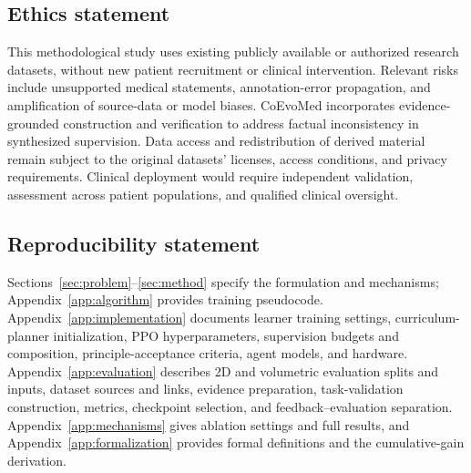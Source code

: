 \documentclass{article}
\begin{document}
\subsection*{Ethics statement}
This methodological study uses existing publicly available or authorized research datasets, without new patient recruitment or clinical intervention. Relevant risks include unsupported medical statements, annotation-error propagation, and amplification of source-data or model biases. CoEvoMed incorporates evidence-grounded construction and verification to address factual inconsistency in synthesized supervision. Data access and redistribution of derived material remain subject to the original datasets' licenses, access conditions, and privacy requirements. Clinical deployment would require independent validation, assessment across patient populations, and qualified clinical oversight.

\subsection*{Reproducibility statement}
Sections~\ref{sec:problem}--\ref{sec:method} specify the formulation and mechanisms; Appendix~\ref{app:algorithm} provides training pseudocode. Appendix~\ref{app:implementation} documents learner training settings, curriculum-planner initialization, PPO hyperparameters, supervision budgets and composition, principle-acceptance criteria, agent models, and hardware. Appendix~\ref{app:evaluation} describes 2D and volumetric evaluation splits and inputs, dataset sources and links, evidence preparation, task-validation construction, metrics, checkpoint selection, and feedback--evaluation separation. Appendix~\ref{app:mechanisms} gives ablation settings and full results, and Appendix~\ref{app:formalization} provides formal definitions and the cumulative-gain derivation.



\appendix

\end{document}
